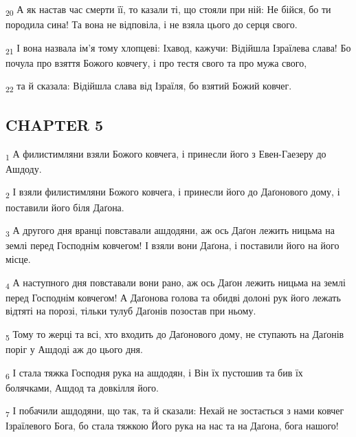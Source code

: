 \begin{tcolorbox}
\textsubscript{20} А як настав час смерти її, то казали ті, що стояли при ній: Не бійся, бо ти породила сина! Та вона не відповіла, і не взяла цього до серця свого.
\end{tcolorbox}
\begin{tcolorbox}
\textsubscript{21} І вона назвала ім'я тому хлопцеві: Іхавод, кажучи: Відійшла Ізраїлева слава! Бо почула про взяття Божого ковчегу, і про тестя свого та про мужа свого,
\end{tcolorbox}
\begin{tcolorbox}
\textsubscript{22} та й сказала: Відійшла слава від Ізраїля, бо взятий Божий ковчег.
\end{tcolorbox}
\subsection{CHAPTER 5}
\begin{tcolorbox}
\textsubscript{1} А филистимляни взяли Божого ковчега, і принесли його з Евен-Гаезеру до Ашдоду.
\end{tcolorbox}
\begin{tcolorbox}
\textsubscript{2} І взяли филистимляни Божого ковчега, і принесли його до Даґонового дому, і поставили його біля Даґона.
\end{tcolorbox}
\begin{tcolorbox}
\textsubscript{3} А другого дня вранці повставали ашдодяни, аж ось Даґон лежить ницьма на землі перед Господнім ковчегом! І взяли вони Даґона, і поставили його на його місце.
\end{tcolorbox}
\begin{tcolorbox}
\textsubscript{4} А наступного дня повставали вони рано, аж ось Даґон лежить ницьма на землі перед Господнім ковчегом! А Даґонова голова та обидві долоні рук його лежать відтяті на порозі, тільки тулуб Даґонів позостав при ньому.
\end{tcolorbox}
\begin{tcolorbox}
\textsubscript{5} Тому то жерці та всі, хто входить до Даґонового дому, не ступають на Даґонів поріг у Ашдоді аж до цього дня.
\end{tcolorbox}
\begin{tcolorbox}
\textsubscript{6} І стала тяжка Господня рука на ашдодян, і Він їх пустошив та бив їх болячками, Ашдод та довкілля його.
\end{tcolorbox}
\begin{tcolorbox}
\textsubscript{7} І побачили ашдодяни, що так, та й сказали: Нехай не зостається з нами ковчег Ізраїлевого Бога, бо стала тяжкою Його рука на нас та на Даґона, бога нашого!
\end{tcolorbox}
